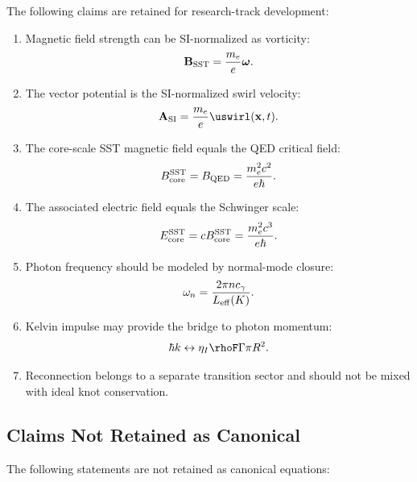     The following claims are retained for research-track development:
    
    \begin{enumerate}
        \item Magnetic field strength can be SI-normalized as vorticity:
        \[
            \mathbf{B}_{\rm SST}
            =
            \frac{m_e}{e}\boldsymbol{\omega}.
        \]
        
        \item The vector potential is the SI-normalized swirl velocity:
        \[
            \mathbf{A}_{\rm SI}
            =
            \frac{m_e}{e}\uswirl(\mathbf{x},t).
        \]
        
        \item The core-scale SST magnetic field equals the QED critical field:
        \[
            B_{\rm core}^{\rm SST}
            =
            B_{\rm QED}
            =
            \frac{m_e^2c^2}{e\hbar}.
        \]
        
        \item The associated electric field equals the Schwinger scale:
        \[
            E_{\rm core}^{\rm SST}
            =
            cB_{\rm core}^{\rm SST}
            =
            \frac{m_e^2c^3}{e\hbar}.
        \]
        
        \item Photon frequency should be modeled by normal-mode closure:
        \[
            \omega_n
            =
            \frac{2\pi n c_\gamma}{L_{\rm eff}(K)}.
        \]
        
        \item Kelvin impulse may provide the bridge to photon momentum:
        \[
            \hbar k
            \leftrightarrow
            \eta_I\rhoF\Gamma\pi R^2.
        \]
        
        \item Reconnection belongs to a separate transition sector and should
        not be mixed with ideal knot conservation.
    \end{enumerate}

\subsection{Claims Not Retained as Canonical}
    
    The following statements are not retained as canonical equations:
    
